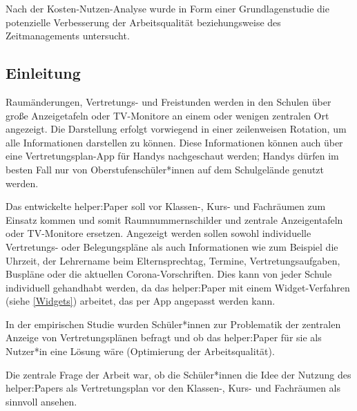 \documentclass[10pt]{article}
\begin{document}
Nach der Kosten-Nutzen-Analyse wurde in Form einer Grundlagenstudie die potenzielle Verbesserung der Arbeitsqualität beziehungsweise des Zeitmanagements untersucht.

\subsection{Einleitung}
Raumänderungen, Vertretungs- und Freistunden werden in den Schulen über große Anzeigetafeln oder TV-Monitore an einem oder wenigen zentralen Ort angezeigt. Die Darstellung erfolgt vorwiegend in einer zeilenweisen Rotation, um alle Informationen darstellen zu können. 
Diese Informationen können auch über eine Vertretungsplan-App für Handys nachgeschaut werden; Handys dürfen im besten Fall nur von Oberstufenschüler*innen auf dem Schulgelände genutzt werden.

Das entwickelte helper:Paper soll vor Klassen-, Kurs- und Fachräumen zum Einsatz kommen und somit Raumnummernschilder und zentrale Anzeigentafeln oder TV-Monitore ersetzen. Angezeigt werden sollen sowohl individuelle Vertretungs- oder Belegungspläne als auch Informationen wie zum Beispiel die Uhrzeit, der Lehrername beim Elternsprechtag, Termine, Vertretungsaufgaben, Buspläne oder die aktuellen Corona-Vorschriften. Dies kann von jeder Schule individuell gehandhabt werden, da das helper:Paper mit einem Widget-Verfahren (siehe \ref{Widgets}) arbeitet, das per App angepasst werden kann.

In der empirischen Studie wurden Schüler*innen zur Problematik der zentralen Anzeige von Vertretungsplänen befragt und ob das helper:Paper für sie als Nutzer*in eine Lösung wäre (Optimierung der Arbeitsqualität).

Die zentrale Frage der Arbeit war, ob die Schüler*innen die Idee der Nutzung des helper:Papers als Vertretungsplan vor den Klassen-, Kurs- und Fachräumen als sinnvoll ansehen.
\end{document}
